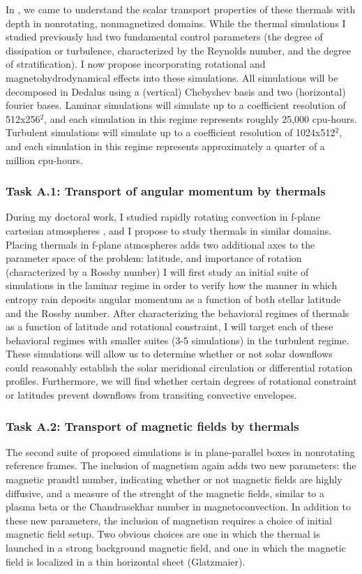 \documentclass[aasms,12pt]{article}
\begin{document}
In \citet{andersLB2019}, we came to understand the scalar transport properties of these thermals with depth in nonrotating, nonmagnetized domains.
While the thermal simulations I studied previously had two fundamental control parameters (the degree of dissipation or turbulence, characterized by the Reynolds number, and the degree of stratification).
I now propose incorporating rotational and magnetohydrodynamical effects into these simulations.
All simulations will be decomposed in Dedalus using a (vertical) Chebyshev basis and two (horizontal) fourier bases.
Laminar simulations will simulate up to a coefficient resolution of 512x256$^2$, and each simulation in this regime represents roughly 25,000 cpu-hours.
Turbulent simulations will simulate up to a coefficient resolution of 1024x512$^2$, and each simulation in this regime represents approximately a quarter of a million cpu-hours.

\subsubsection{Task A.1: Transport of angular momentum by thermals}
During my doctoral work, I studied rapidly rotating convection in f-plane cartesian atmospheres \citep{anders&all2019}, and I propose to study thermals in similar domains.
Placing thermals in f-plane atmospheres adds two additional axes to the parameter space of the problem: latitude, and importance of rotation (characterized by a Rossby number)
I will first study an initial suite of simulations in the laminar regime in order to verify how the manner in which entropy rain deposits angular momentum as a function of both stellar latitude and the Rossby number.
After characterizing the behavioral regimes of thermals as a function of latitude and rotational constraint, I will target each of these behavioral regimes with smaller suites (3-5 simulations) in the turbulent regime.
These simulations will allow us to determine whether or not solar downflows could reasonably establish the solar meridional circulation or differential rotation profiles.
Furthermore, we will find whether certain degrees of rotational constraint or latitudes prevent downflows from transiting convective envelopes.

\subsubsection{Task A.2: Transport of magnetic fields by thermals}
The second suite of proposed simulations is in plane-parallel boxes in nonrotating reference frames.
The inclusion of magnetism again adds two new parameters: the magnetic prandtl number, indicating whether or not magnetic fields are highly diffusive, and a measure of the strenght of the magnetic fields, similar to a plasma beta or the Chandrasekhar number in magnetoconvection.
In addition to these new parameters, the inclusion of magnetism requires a choice of initial magnetic field setup.
Two obvious choices are one in which the thermal is launched in a strong background magnetic field, and one in which the magnetic field is localized in a thin horizontal sheet (Glatzmaier).
\end{document}

